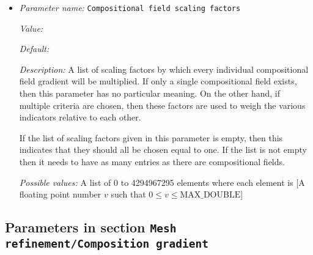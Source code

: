 \begin{itemize}
\item {\it Parameter name:} {\tt Compositional field scaling factors}
\label{parameters:Mesh refinement/Composition approximate gradient/Compositional field scaling factors}
\label{parameters:Mesh_20refinement/Composition_20approximate_20gradient/Compositional_20field_20scaling_20factors}


{\it Value:} 


{\it Default:} 


{\it Description:} A list of scaling factors by which every individual compositional field gradient will be multiplied. If only a single compositional field exists, then this parameter has no particular meaning. On the other hand, if multiple criteria are chosen, then these factors are used to weigh the various indicators relative to each other. 

If the list of scaling factors given in this parameter is empty, then this indicates that they should all be chosen equal to one. If the list is not empty then it needs to have as many entries as there are compositional fields.


{\it Possible values:} A list of 0 to 4294967295 elements where each element is [A floating point number $v$ such that $0 \leq v \leq \text{MAX\_DOUBLE}$]
\end{itemize}

\subsection{Parameters in section \tt Mesh refinement/Composition gradient}
\label{parameters:Mesh_20refinement/Composition_20gradient}


